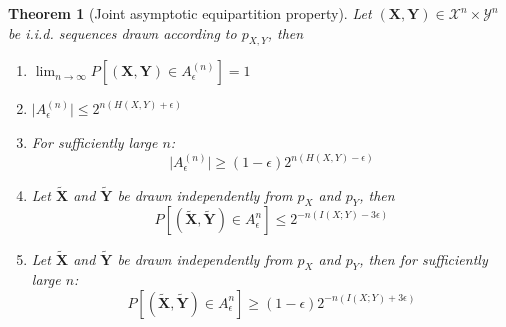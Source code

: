 \documentclass{article}
\newcommand{\norm}[1]{\vert {#1} \vert}
\newtheorem{theorem}{Theorem}[section]
\begin{document}
    \begin{theorem}[Joint asymptotic equipartition property]
        Let $(\mathbf{X}, \mathbf{Y}) \in \mathcal{X}^n \times \mathcal{Y}^n$ be i.i.d. sequences drawn according to $p_{X, Y}$, then

        \begin{enumerate}
            \item $
                \lim_{n \rightarrow \infty}
                P[(\mathbf{X}, \mathbf{Y}) \in A_\epsilon^{(n)}] = 1
            $
            \item $\norm{A_\epsilon^{(n)}} \leq 2^{
                n(H(X, Y) + \epsilon)
            }$
            \item For sufficiently large $n$:
                $$
                \norm{A_\epsilon^{(n)}} \geq (1-\epsilon)2^{n(H(X, Y) - \epsilon)}
                $$
            \item Let $\tilde{\mathbf{X}}$ and $\tilde{\mathbf{Y}}$ be drawn independently from $p_X$ and $p_Y$, then
                $$
                    P[(\tilde{\mathbf{X}}, \tilde{\mathbf{Y}}) \in A_\epsilon^n] 
                    \leq 2^{-n(I(X; Y) - 3\epsilon)}
                $$
            \item Let $\tilde{\mathbf{X}}$ and $\tilde{\mathbf{Y}}$ be drawn independently from $p_X$ and $p_Y$, then for sufficiently large $n$:
                $$
                    P[(\tilde{\mathbf{X}}, \tilde{\mathbf{Y}}) \in A_\epsilon^n] 
                    \geq (1-\epsilon)2^{-n(I(X; Y) + 3\epsilon)}
                $$
        \end{enumerate}
    \end{theorem}
\end{document}
